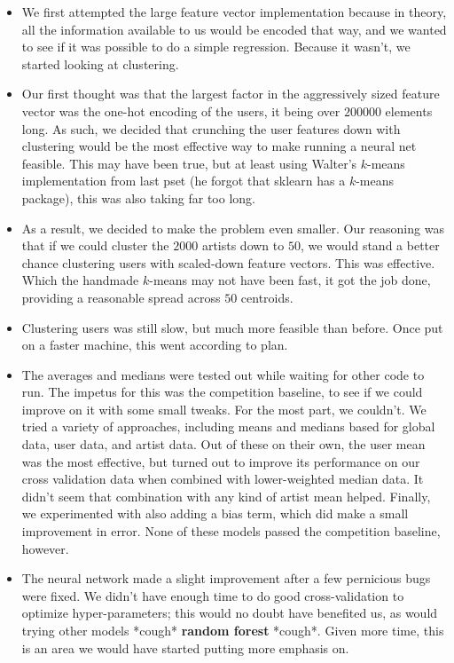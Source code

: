 \documentclass[11pt]{article}
\begin{document}
\begin{itemize}
	\item We first attempted the large feature vector implementation because in theory, all the information available to us would be encoded that way, and we wanted to see if it was possible to do a simple regression. Because it wasn't, we started looking at clustering.
	\item Our first thought was that the largest factor in the aggressively sized feature vector was the one-hot encoding of the users, it being over $200000$ elements long. As such, we decided that crunching the user features down with clustering would be the most effective way to make running a neural net feasible. This may have been true, but at least using Walter's $k$-means implementation from last pset (he forgot that sklearn has a $k$-means package), this was also taking far too long.
	\item As a result, we decided to make the problem even smaller. Our reasoning was that if we could cluster the $2000$ artists down to $50$, we would stand a better chance clustering users with scaled-down feature vectors. This was effective. Which the handmade $k$-means may not have been fast, it got the job done, providing a reasonable spread across $50$ centroids.
	\item Clustering users was still slow, but much more feasible than before. Once put on a faster machine, this went according to plan.
	\item The averages and medians were tested out while waiting for other code to run. The impetus for this was the competition baseline, to see if we could improve on it with some small tweaks. For the most part, we couldn't. We tried a variety of approaches, including means and medians based for global data, user data, and artist data. Out of these on their own, the user mean was the most effective, but turned out to improve its performance on our cross validation data when combined with lower-weighted median data. It didn't seem that combination with any kind of artist mean helped. Finally, we experimented with also adding a bias term, which did make a small improvement in error. None of these models passed the competition baseline, however.
	\item The neural network made a slight improvement after a few pernicious bugs were fixed. We didn't have enough time to do good cross-validation to optimize hyper-parameters; this would no doubt have benefited us, as would trying other models *cough* \textbf{random forest} *cough*. Given more time, this is an area we would have started putting more emphasis on.
\end{itemize}
\end{document}
